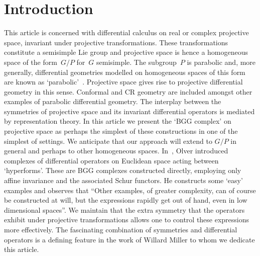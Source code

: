 \section{Introduction}
This article is concerned with dif\/ferential calculus on real or complex
projective space, in\-variant under projective transformations. These
transformations constitute a semisimple Lie group and projective space is hence
a homogeneous space of the form~$G/P$ for~$G$ semisimple. The subgroup~$P$ is
parabolic and, more generally, dif\/ferential geometries modelled on homogeneous
spaces of this form are known as `parabolic'~\cite{thebook}. Projective space
gives rise to projective dif\/ferential geometry in this sense. Conformal and CR
geometry are included amongst other examples of parabolic dif\/ferential
geometry. The interplay between the symmetries of projective space and its
invariant dif\/ferential operators is mediated by representation theory. In this
article we present the `BGG complex' on projective space as perhaps the
simplest of these constructions in one of the simplest of settings. We
anticipate that our approach will extend to $G/P$ in general and perhaps to
other homogeneous spaces. In~\cite{o}, Olver introduced complexes of
dif\/ferential operators on Euclidean space acting between `hyperforms'. These
are BGG complexes constructed directly, employing only af\/f\/ine invariance and
the associated Schur functors. He constructs some `easy' examples and observes
that ``Other examples, of greater complexity, can of course be constructed at
will, but the expressions rapidly get out of hand, even in low dimensional
spaces''. We maintain that the extra symmetry that the operators exhibit under
projective transformations allows one to control these expressions more
ef\/fectively. The fascinating combination of symmetries and dif\/ferential
operators is a def\/ining feature in the work of Willard Miller to whom we
dedicate this article.

